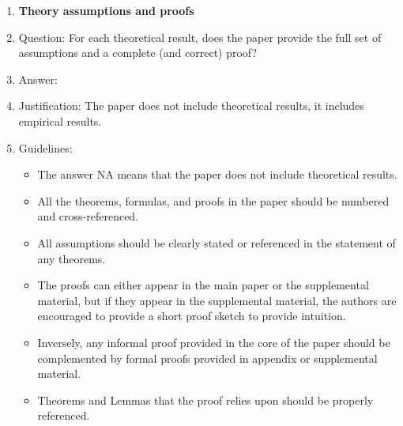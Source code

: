 \documentclass{article}
\begin{document}
\begin{enumerate}
\item {\bf Theory assumptions and proofs}
    \item[] Question: For each theoretical result, does the paper provide the full set of assumptions and a complete (and correct) proof?
    \item[] Answer: \answerNA{} %
    \item[] Justification: The paper does not include theoretical results, it includes empirical results.
    \item[] Guidelines:
    \begin{itemize}
        \item The answer NA means that the paper does not include theoretical results. 
        \item All the theorems, formulas, and proofs in the paper should be numbered and cross-referenced.
        \item All assumptions should be clearly stated or referenced in the statement of any theorems.
        \item The proofs can either appear in the main paper or the supplemental material, but if they appear in the supplemental material, the authors are encouraged to provide a short proof sketch to provide intuition. 
        \item Inversely, any informal proof provided in the core of the paper should be complemented by formal proofs provided in appendix or supplemental material.
        \item Theorems and Lemmas that the proof relies upon should be properly referenced. 
    \end{itemize}


\end{enumerate}
\end{document}
